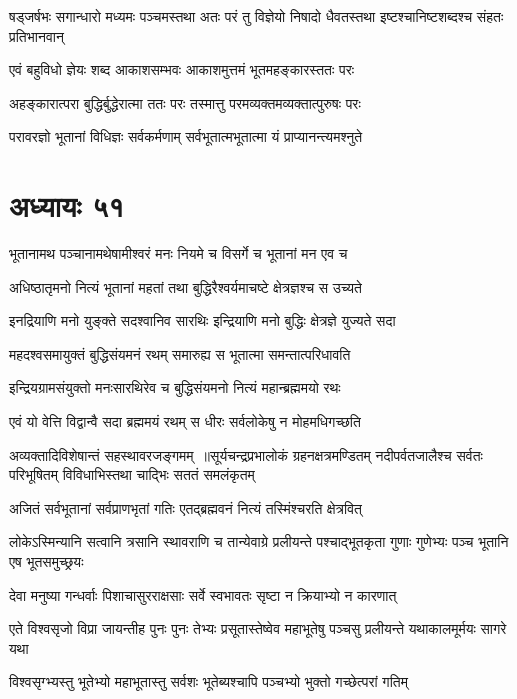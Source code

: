 \threelineshloka
{षड्जर्षभः सगान्धारो मध्यमः पञ्चमस्तथा}
{अतः परं तु विज्ञेयो निषादो धैवतस्तथा}
{इष्टश्चानिष्टशब्दश्च संहतः प्रतिभानवान्}


\twolineshloka
{एवं बहुविधो ज्ञेयः शब्द आकाशसम्भवः}
{आकाशमुत्तमं भूतमहङ्कारस्ततः परः}


\twolineshloka
{अहङ्कारात्परा बुद्धिर्बुद्धेरात्मा ततः परः}
{तस्मात्तु परमव्यक्तमव्यक्तात्पुरुषः परः}


\twolineshloka
{परावरज्ञो भूतानां विधिज्ञः सर्वकर्मणाम्}
{सर्वभूतात्मभूतात्मा यं प्राप्यानन्त्यमश्नुते}


\chapter{अध्यायः ५१}
\twolineshloka
{भूतानामथ पञ्चानामथेषामीश्वरं मनः}
{नियमे च विसर्गे च भूतानां मन एव च}


\twolineshloka
{अधिष्ठातृमनो नित्यं भूतानां महतां तथा}
{बुद्धिरैश्वर्यमाचष्टे क्षेत्रज्ञश्च स उच्यते}


\twolineshloka
{इनद्रियाणि मनो युङ्क्ते सदश्वानिव सारथिः}
{इन्द्रियाणि मनो बुद्धिः क्षेत्रज्ञे युज्यते सदा}


\twolineshloka
{महदश्वसमायुक्तं बुद्धिसंयमनं रथम्}
{समारुह्य स भूतात्मा समन्तात्परिधावति}


\twolineshloka
{इन्द्रियग्रामसंयुक्तो मनःसारथिरेव च}
{बुद्धिसंयमनो नित्यं महान्ब्रह्ममयो रथः}


\twolineshloka
{एवं यो वेत्ति विद्वान्वै सदा ब्रह्ममयं रथम्}
{स धीरः सर्वलोकेषु न मोहमधिगच्छति}


अव्यक्तादिविशेषान्तं सहस्थावरजङ्गमम् ॥सूर्यचन्द्रप्रभालोकं ग्रहनक्षत्रमण्डितम्
\twolineshloka
{नदीपर्वतजालैश्च सर्वतः परिभूषितम्}
{विविधाभिस्तथा चाद्भिः सततं समलंकृतम्}


\twolineshloka
{अजितं सर्वभूतानां सर्वप्राणभृतां गतिः}
{एतद्ब्रह्मवनं नित्यं तस्मिंश्चरति क्षेत्रवित्}


\threelineshloka
{लोकेऽस्मिन्यानि सत्वानि त्रसानि स्थावराणि च}
{तान्येवाग्रे प्रलीयन्ते पश्चाद्भूतकृता गुणाः}
{गुणेभ्यः पञ्च भूतानि एष भूतसमुच्छ्रयः}


\twolineshloka
{देवा मनुष्या गन्धर्वाः पिशाचासुरराक्षसाः}
{सर्वे स्वभावतः सृष्टा न क्रियाभ्यो न कारणात्}


\threelineshloka
{एते विश्वसृजो विप्रा जायन्तीह पुनः पुनः}
{तेभ्यः प्रसूतास्तेष्वेव महाभूतेषु पञ्चसु}
{प्रलीयन्ते यथाकालमूर्मयः सागरे यथा}


\twolineshloka
{विश्वसृग्भ्यस्तु भूतेभ्यो महाभूतास्तु सर्वशः}
{भूतेब्यश्चापि पञ्चभ्यो भुक्तो गच्छेत्परां गतिम्}


